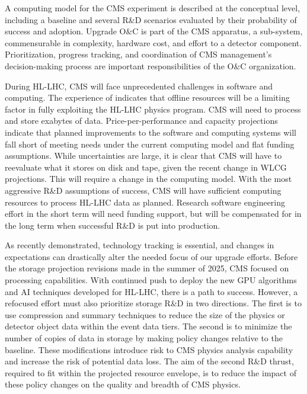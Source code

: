 A computing model for the CMS \PhaseTwo experiment is described at the conceptual level, including a baseline and several R\&D scenarios evaluated by their probability of success and adoption. Upgrade O\&C is part of the CMS apparatus, a sub-system, commensurable in complexity, hardware cost, and effort to a detector component. Prioritization, progress tracking, and coordination of CMS management’s decision-making process are important responsibilities of the O\&C organization.

During HL-LHC, CMS will face unprecedented challenges in software and computing. The experience of \RunThree indicates that offline resources will be a limiting factor in fully exploiting the HL-LHC physics program. CMS will need to process and store exabytes of data. Price-per-performance and capacity projections indicate that planned improvements to the software and computing systems will fall short of meeting needs under the current computing model and flat funding assumptions.  While uncertainties are large, it is clear that CMS will have to reevaluate what it stores on disk and tape, given the recent change in WLCG projections.  This will require a change in the computing model. With the most aggressive R\&D assumptions of success, CMS will have sufficient computing resources to process HL-LHC data as planned. Research software engineering effort in the short term will need funding support, but will be compensated for in the long term when successful R\&D is put into production.

As recently demonstrated, technology tracking is essential, and changes in expectations can drastically alter the needed focus of our upgrade efforts. Before the storage projection revisions made in the summer of 2025, CMS focused on processing capabilities. With continued push to deploy the new \gls{GPU} algorithms and \gls{AI} techniques developed for HL-LHC, there is a path to success. However, a refocused effort must also prioritize storage  R\&D in two directions. The first is to use compression and summary techniques to reduce the size of the physics or detector object data within the event data tiers. The second is to minimize the number of copies of data in storage by making policy changes relative to the baseline. These modifications introduce risk to CMS physics analysis capability and increase the risk of potential data loss. The aim of the second R\&D thrust, required to fit within the projected resource envelope, is to reduce the impact of these policy changes on the quality and breadth of CMS physics.

